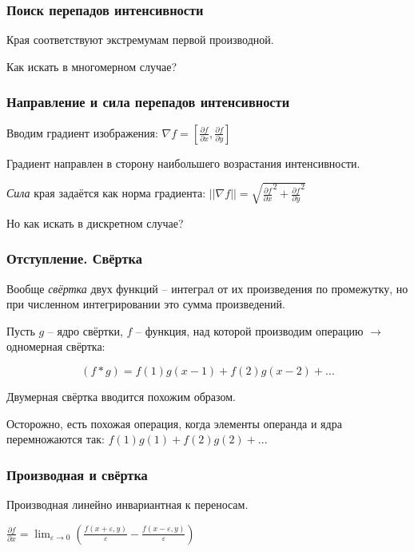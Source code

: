 \documentclass[main.tex]{subfiles}
\begin{document}
\subsubsection{Поиск перепадов интенсивности}

Края соответствуют экстремумам первой производной.

Как искать в многомерном случае?

\subsubsection{Направление и сила перепадов интенсивности}

Вводим градиент изображения: $ \nabla f = \left[ \frac{\partial f}{\partial x}, \frac{\partial f}{\partial y} \right] $

Градиент направлен в сторону наибольшего возрастания интенсивности.

\emph{Сила} края задаётся как норма градиента: $ || \nabla f || = \sqrt{\frac{\partial f}{\partial x}^2 + \frac{\partial f}{\partial y}^2} $

Но как искать в дискретном случае?

\subsubsection{Отступление. Свёртка}

Вообще \emph{свёртка} двух функций -- интеграл от их произведения по промежутку, но при численном интегрировании это сумма произведений.

Пусть $ g $ -- ядро свёртки, $ f $ -- функция, над которой производим операцию $ \to $ одномерная свёртка:

$$ (f * g) = f(1)g(x-1) + f(2)g(x-2) + ... $$

Двумерная свёртка вводится похожим образом.

Осторожно, есть похожая операция, когда элементы операнда и ядра перемножаются так: $ f(1)g(1) + f(2)g(2) + ... $

\subsubsection{Производная и свёртка}

Производная линейно инвариантная к переносам.

$ \frac{\partial f}{\partial x} = \lim_{\varepsilon \to 0} \left( \frac{f(x + \varepsilon, y)}{\varepsilon} - \frac{f(x - \varepsilon, y)}{\varepsilon} \right) $
\end{document}
